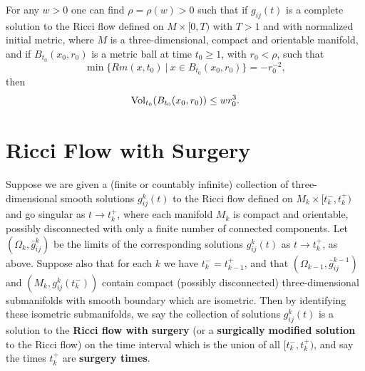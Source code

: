 \begin{corollary}
  \label{cor:cz-small-ball-pseudolocal-curvature-control}

For any $w>0$ one can find $\rho = \rho(w)>0$ such that if
$g_{ij}(t)$ is a complete solution to the Ricci flow defined on
$M\times[0,T)$ with $T>1$ and with normalized initial metric,
where $M$ is a three-dimensional, compact and orientable manifold,
and if $B_{t_0}(x_0,r_0)$ is a metric ball at time $t_0\geq1$,
with $r_0<\rho$, such that$$\min\{ Rm(x,t_0)\ |\ x\in
B_{t_0}(x_0,r_0)\}=-r_0^{-2},$$ then
$$
\operatorname{Vol}_{t_0}(B_{t_0}(x_0,r_0))\leq wr_0^3.
$$
\end{corollary}
\section{Ricci Flow with Surgery}
\begin{definition}
  \label{def:cz-ricci-flow-with-surgery}

Suppose we are given a (finite or countably infinite) collection
of three-dimensional smooth solutions $g^k_{ij}(t)$ to the Ricci
flow defined on $M_k\times [t^-_k,t^+_k)$ and go singular as
$t\rightarrow t^+_k$, where each manifold $M_k$ is compact and
orientable, possibly disconnected with only a finite number of
connected components. Let $(\Omega_k,\bar{g}^k_{ij})$ be the
limits of the corresponding solutions $g^k_{ij}(t)$ as
$t\rightarrow t^+_k$, as above. Suppose also that for each $k$ we
have $t^-_k=t^+_{k-1}$, and that
$(\Omega_{k-1},\bar{g}^{k-1}_{ij})$ and $(M_k,g^k_{ij}(t^-_k))$
contain compact (possibly disconnected) three-dimensional
submanifolds with smooth boundary which are isometric. Then by
identifying these isometric submanifolds, we say the collection of
solutions $g^k_{ij}(t)$ is a solution to the \textbf{Ricci flow
with surgery} (or a
\textbf{surgically modified solution} to the Ricci flow)
 on the time interval which is
the union of all $[t^-_k,t^+_k)$, and say the times $t^+_k$ are
\textbf{surgery
times}. %
\end{definition}
